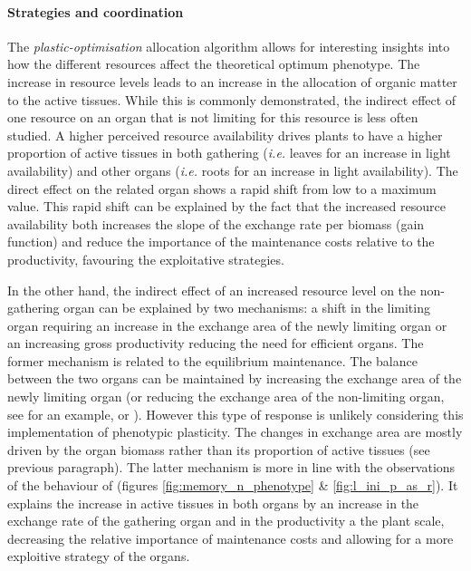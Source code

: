 \paragraph{Strategies and coordination}

The \textit{plastic-optimisation} allocation algorithm allows for interesting insights into how the different resources affect the theoretical optimum phenotype. The increase in resource levels leads to an increase in the allocation of organic matter to the active tissues. While this is commonly demonstrated, the indirect effect of one resource on an organ that is not limiting for this resource is less often studied. A higher perceived resource availability drives plants to have a higher proportion of active tissues in both gathering (\textit{i.e.} leaves for an increase in light availability) and other organs (\textit{i.e.} roots for an increase in light availability). The direct effect on the related organ shows a rapid shift from low to a maximum value. This rapid shift can be explained by the fact that the increased resource availability both increases the slope of the exchange rate per biomass (gain function) and reduce the importance of the maintenance costs relative to the productivity, favouring the exploitative strategies.

In the other hand, the indirect effect of an increased resource level on the non-gathering organ can be explained by two mechanisms: a shift in the limiting organ requiring an increase in the exchange area of the newly limiting organ or an increasing gross productivity reducing the need for efficient organs. The former mechanism is related to the equilibrium maintenance. The balance between the two organs can be maintained by increasing the exchange area of the newly limiting organ (or reducing the exchange area of the non-limiting organ, see \cite{liu_biomass_2004} for an example, or \cite{grassein_plant_2010}). However this type of response is unlikely considering this implementation of phenotypic plasticity. The changes in exchange area are mostly driven by the organ biomass rather than its proportion of active tissues (see previous paragraph). The latter mechanism is more in line with the observations of the behaviour of \model (figures \ref{fig:memory_n_phenotype} \& \ref{fig:l_ini_p_as_r}). It explains the increase in active tissues in both organs by an increase in the exchange rate of the gathering organ and in the productivity a the plant scale, decreasing the relative importance of maintenance costs and allowing for a more exploitive strategy of the organs. 

